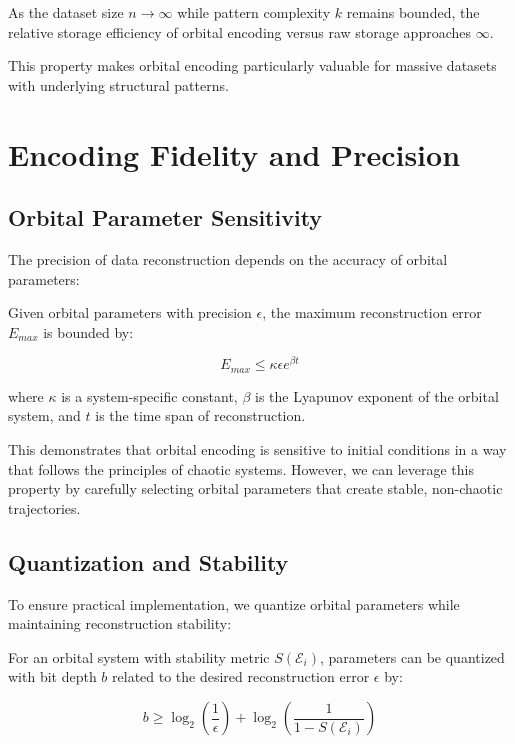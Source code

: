 \begin{proposition}
As the dataset size $n \to \infty$ while pattern complexity $k$ remains bounded, the relative storage efficiency of orbital encoding versus raw storage approaches $\infty$.
\end{proposition}

This property makes orbital encoding particularly valuable for massive datasets with underlying structural patterns.

\section{Encoding Fidelity and Precision}

\subsection{Orbital Parameter Sensitivity}

The precision of data reconstruction depends on the accuracy of orbital parameters:

\begin{theorem}
Given orbital parameters with precision $\epsilon$, the maximum reconstruction error $E_{max}$ is bounded by:

\begin{equation}
E_{max} \leq \kappa \epsilon e^{\beta t}
\end{equation}

where $\kappa$ is a system-specific constant, $\beta$ is the Lyapunov exponent of the orbital system, and $t$ is the time span of reconstruction.
\end{theorem}

This demonstrates that orbital encoding is sensitive to initial conditions in a way that follows the principles of chaotic systems. However, we can leverage this property by carefully selecting orbital parameters that create stable, non-chaotic trajectories.

\subsection{Quantization and Stability}

To ensure practical implementation, we quantize orbital parameters while maintaining reconstruction stability:

\begin{proposition}
For an orbital system with stability metric $S(\mathcal{E}_i)$, parameters can be quantized with bit depth $b$ related to the desired reconstruction error $\epsilon$ by:

\begin{equation}
b \geq \log_2\left(\frac{1}{\epsilon}\right) + \log_2\left(\frac{1}{1 - S(\mathcal{E}_i)}\right)
\end{equation}
\end{proposition}

